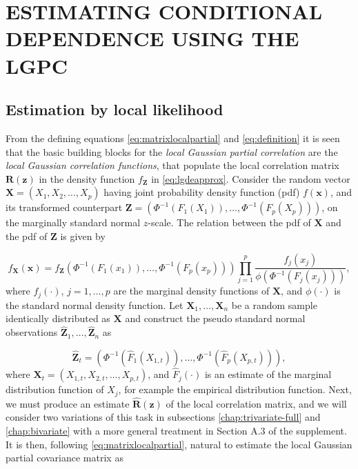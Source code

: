 \documentclass[
  12pt,
  letterpaper]{article}
\newcommand{\X}{\bm{X}}
\newcommand{\x}{\bm{x}}
\newcommand{\Z}{\bm{Z}}
\newcommand{\z}{\bm{z}}
\newcommand{\hZ}{\widehat{\bm{Z}}}
\newcommand{\R}{\bm{R}}
\newcommand{\hR}{\widehat{\bm{R}}}
\newcommand{\hF}{\widehat{F}}
\theoremstyle{definition}
\theoremstyle{definition}
\theoremstyle{definition}
\theoremstyle{remark}
\begin{document}
\hypertarget{chap:estimation}{%
\section{ESTIMATING CONDITIONAL DEPENDENCE USING THE LGPC}\label{chap:estimation}}

\hypertarget{ll}{%
\subsection{Estimation by local likelihood}\label{ll}}

From the defining equations \eqref{eq:matrixlocalpartial} and \eqref{eq:definition} it is seen that the basic building blocks for the \emph{local Gaussian partial correlation} are the \emph{local Gaussian correlation functions}, that populate the local correlation matrix \(\R(\z)\) in the density function \(f_{\Z}\) in \eqref{eq:lgdeapprox}. Consider the random vector \(\X = (X_1, X_2, \ldots, X_p)\) having joint probability density function (pdf) \(f(\x)\), and its transformed counterpart \(\Z = \left(\Phi^{-1}(F_1(X_1)), \ldots, \Phi^{-1}(F_p(X_p))\right)\), on the marginally standard normal \(z\)-scale. The relation between the pdf of \(\X\) and the pdf of \(\Z\) is given by

\begin{equation}
f_{\X}(\x) = f_{\Z}\left(\Phi^{-1}\left(F_1(x_1)\right), \ldots, \Phi^{-1}\left(F_p(x_p)\right)\right)\prod_{j=1}^p 
\frac{f_j(x_j)}{\phi\left(\Phi^{-1}\left(F_j(x_j)\right)\right)},
\label{eq:fxfz}
\end{equation}
where \(f_j(\cdot)\), \(j = 1,\ldots, p\) are the marginal density functions of \(\X\), and \(\phi(\cdot)\) is the standard normal density function. Let \(\X_1, \ldots, \X_n\) be a random sample identically distributed as \(\X\) and construct the pseudo standard normal observations \(\hZ_1, \ldots, \hZ_n\) as

\begin{equation}
\hZ_t = \left(\Phi^{-1}\left(\hF_1(X_{1,t})\right), \ldots, \Phi^{-1}\left(\hF_p(X_{p,t})\right)\right),
\label{eq:pseudoobservations}
\end{equation}
where \(\X_t = (X_{1,t}, X_{2,t}, \ldots, X_{p,t})\), and \(\hF_j(\cdot)\) is an estimate of the marginal distribution function of \(X_j\), for example the empirical distribution function. Next, we must produce an estimate \(\hR(\z)\) of the local correlation matrix, and we will consider two variations of this task in subsections \ref{chap:trivariate-full} and \ref{chap:bivariate} with a more general treatment in Section A.3 of the supplement. It is then, following \eqref{eq:matrixlocalpartial}, natural to estimate the local Gaussian partial covariance matrix as
\end{document}

